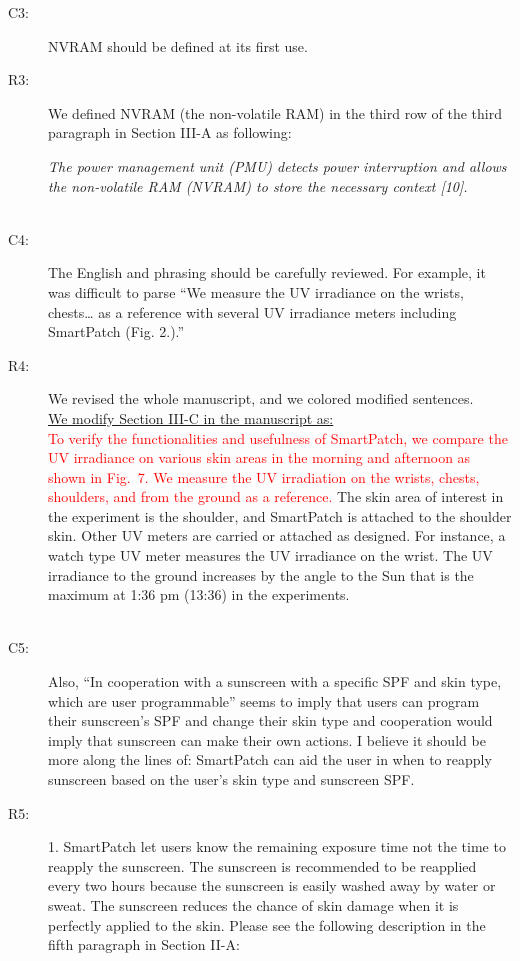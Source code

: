 \documentclass[onecolumn]{IEEEconf}
\begin{document}
\begin{description}
\item [C3: ] NVRAM should be defined at its first use.
\item [R3: ] We defined NVRAM (the non-volatile RAM) in the third row of the third paragraph in Section III-A as following:

\textit{The power management unit (PMU) detects power interruption and allows the non-volatile RAM (NVRAM) to store the necessary context [10].}\\
~\\

\item [C4:] The English and phrasing should be carefully reviewed. For example, it was difficult to parse ``We measure the UV irradiance on the wrists, chests… as a reference with several UV irradiance meters including SmartPatch (Fig. 2.).'' 

\item [R4: ] We revised the whole manuscript, and we colored modified sentences. \\

\underline{We modify Section III-C in the manuscript as:}\\
\textcolor{red}{To verify the functionalities and usefulness of SmartPatch, we compare the UV irradiance on various skin areas in the morning and afternoon as shown in Fig.~7. We measure the UV irradiation on the wrists, chests, shoulders, and from the ground as a reference.} The skin area of interest in the experiment is the shoulder, and SmartPatch is attached to the shoulder skin. Other UV meters are carried or attached as designed. For instance, a watch type UV meter measures the UV irradiance on the wrist. The UV irradiance to the ground increases by the angle to the Sun that is the maximum at 1:36 pm (13:36) in the experiments.\\
~\\


\item [C5:] Also, ``In cooperation with a sunscreen with a specific SPF and skin type, which are user programmable'' seems to imply that users can program their sunscreen's SPF and change their skin type and cooperation would imply that sunscreen can make their own actions. I believe it should be more along the lines of: SmartPatch can aid the user in when to reapply sunscreen based on the user's skin type and sunscreen SPF.

\item [R5: ] 
1. SmartPatch let users know the remaining exposure time not the time to reapply the sunscreen. The sunscreen is recommended to be reapplied every two hours because the sunscreen is easily washed away by water or sweat. The sunscreen reduces the chance of skin damage when it is perfectly applied to the skin. Please see the following description in the fifth paragraph in Section II-A:\\


\end{description}
\end{document}
